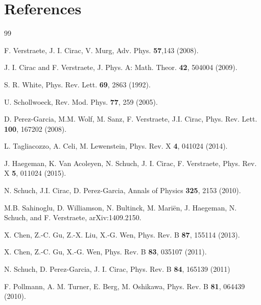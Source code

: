 \documentclass{elsarticle}
\begin{document}

\section*{References}

\begin{thebibliography}{99}

F. Verstraete, J. I. Cirac, V. Murg,
Adv. Phys. {\bf 57},143 (2008).


J. I. Cirac and F. Verstraete, J. Phys. A: Math. Theor. {\bf 42}, 504004 (2009).

S. R. White,
Phys. Rev. Lett. {\bf 69}, 2863 (1992).

U. Schollwoeck,
Rev. Mod. Phys. {\bf 77}, 259 (2005).

D. Perez-Garcia, M.M. Wolf, M. Sanz, F. Verstraete,  J.I. Cirac,
Phys. Rev. Lett. {\bf 100}, 167202 (2008).


L. Tagliacozzo, A. Celi,  M. Lewenstein,
Phys. Rev. X {\bf 4}, 041024 (2014).

J. Haegeman, K. Van Acoleyen, N. Schuch, J. I. Cirac,  F. Verstraete,
Phys. Rev. X {\bf 5}, 011024 (2015).


N. Schuch, J.I. Cirac,  D. Perez-Garcia,
Annals of Physics {\bf 325}, 2153 (2010).

M.B. Sahinoglu, D. Williamson, N. Bultinck, M. Mari\"en, J. Haegeman,
N. Schuch, and F. Verstraete,
arXiv:1409.2150.

X. Chen, Z.-C. Gu, Z.-X. Liu,  X.-G. Wen,
Phys. Rev. B {\bf 87}, 155114 (2013).

X. Chen, Z.-C. Gu, X.-G. Wen,
Phys. Rev. B {\bf 83}, 035107 (2011).

N. Schuch, D. Perez-Garcia,  J. I. Cirac,
Phys. Rev. B {\bf 84}, 165139 (2011)

F. Pollmann, A. M. Turner, E. Berg,  M. Oshikawa,
Phys. Rev. B {\bf 81}, 064439 (2010).


\end{thebibliography}
\end{document}
